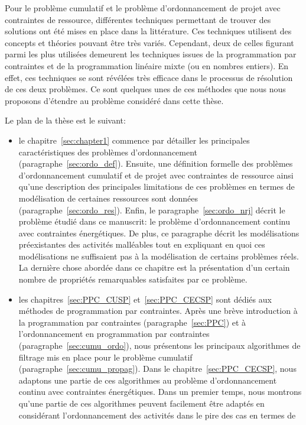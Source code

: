 Pour le problème cumulatif et le problème d'ordonnancement de projet
avec contraintes de ressource, différentes techniques permettant de
trouver des solutions ont été mises en place dans la littérature. Ces techniques utilisent
des concepts et théories pouvant être très variés. Cependant, deux de
celles figurant parmi les plus utilisées demeurent les techniques issues
de la programmation par contraintes et de la programmation linéaire
mixte (ou en nombres entiers). En effet, ces techniques se sont
révélées très efficace dans le processus de résolution de ces deux
problèmes. Ce sont quelques unes de ces méthodes que nous nous
proposons d'étendre au problème considéré dans cette thèse.

Le plan de la thèse est le suivant: 
\begin{itemize}
\item le chapitre~\ref{sec:chapter1} commence par détailler les
principales caractéristiques des problèmes d'ordonnancement
(paragraphe~\ref{sec:ordo_def}). Ensuite, une définition formelle des
problèmes d'ordonnancement cumulatif et de projet
avec contraintes de ressource ainsi qu'une description des principales
limitations de ces problèmes en termes de modélisation de certaines
ressources sont données
(paragraphe~\ref{sec:ordo_res}).  Enfin, le
paragraphe~\ref{sec:ordo_nrj} décrit le problème étudié dans ce
manuscrit: le problème d'ordonnancement continu avec contraintes
énergétiques. De plus, ce paragraphe décrit les modélisations
préexistantes des activités malléables tout en expliquant en quoi ces
modélisations ne suffisaient pas à la modélisation de certains problèmes
réels. La dernière chose abordée dans ce chapitre est la présentation
d'un certain nombre de propriétés remarquables satisfaites par ce problème.
\item les chapitres~\ref{sec:PPC_CUSP} et~\ref{sec:PPC_CECSP} sont
  dédiés aux méthodes de programmation par
  contraintes. Après une brève introduction à la programmation par
  contraintes (paragraphe~\ref{sec:PPC}) et à l'ordonnancement en
  programmation par contraintes (paragraphe~\ref{sec:cumu_ordo}), nous
  présentons les principaux algorithmes de filtrage mis en place pour
  le problème cumulatif (paragraphe~\ref{sec:cumu_propag}). Dans le
  chapitre~\ref{sec:PPC_CECSP}, nous adaptons une partie de ces
  algorithmes au problème d'ordonnancement continu avec contraintes
  énergétiques. Dans un premier temps, nous montrons qu'une partie de
  ces algorithmes peuvent facilement être adaptés en considérant
  l'ordonnancement des activités dans le pire des cas en termes de

\end{itemize}
